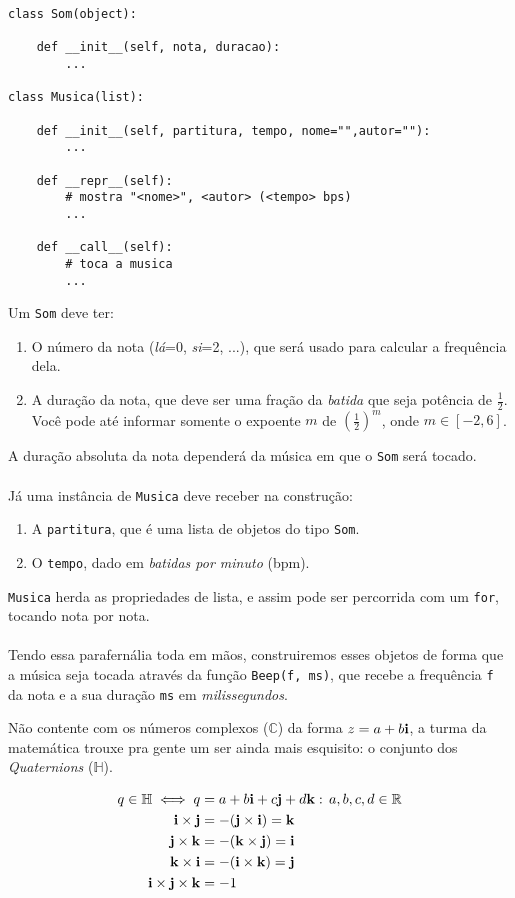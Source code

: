 \documentclass[12pt]{article}
\begin{document}
	\begin{lstlisting}
class Som(object):

    def __init__(self, nota, duracao):
        ...
        
class Musica(list):

    def __init__(self, partitura, tempo, nome="",autor=""):
        ...
        
    def __repr__(self):
        # mostra "<nome>", <autor> (<tempo> bps)
        ...
        
    def __call__(self):
        # toca a musica
        ...
	\end{lstlisting}
	Um \texttt{Som} deve ter:
	\begin{enumerate}
		\item O número da nota (\emph{lá}=0, \emph{si}=2, ...), que será usado para calcular a frequência dela.
		\item A duração da nota, que deve ser uma fração da \emph{batida} que seja potência de $\frac{1}{2}$. Você pode até informar somente o expoente $m$ de $(\frac{1}{2})^{m}$, onde $m \in [-2, 6]$.
	\end{enumerate}
	A duração absoluta da nota dependerá da música em que o \texttt{Som} será tocado.
	\\ \\
	Já uma instância de \texttt{Musica} deve receber na construção:
	\begin{enumerate}
		\item A \texttt{partitura}, que é uma lista de objetos do tipo \texttt{Som}.
		\item O \texttt{tempo}, dado em \emph{batidas por minuto} (bpm).
	\end{enumerate}
	\texttt{Musica} herda as propriedades de lista, e assim pode ser percorrida com um \texttt{for}, tocando nota por nota.
	\\ \\
	Tendo essa parafernália toda em mãos, construiremos esses objetos de forma que a música seja tocada através da função \texttt{Beep(f, ms)}, que recebe a frequência \texttt{f} da nota e a sua duração \texttt{ms} em \emph{milissegundos}.

	
	Não contente com os números complexos ($\mathbb{C}$) da forma $z = a + b\mathbf{i}$, a turma da matemática trouxe pra gente um ser ainda mais esquisito: o conjunto dos \emph{Quaternions} ($\mathbb{H}$).
	
	\begin{align*}
	q \in \mathbb{H} \iff q &= a + b \mathbf{i} + c \mathbf{j} + d \mathbf{k} : \, a,b,c,d \in \mathbb{R}\\
	\mathbf{i} \times \mathbf{j} &= -(\mathbf{j} \times \mathbf{i}) = \mathbf{k}\\
	\mathbf{j} \times \mathbf{k} &= -(\mathbf{k} \times \mathbf{j}) = \mathbf{i}\\
	\mathbf{k} \times \mathbf{i} &= -(\mathbf{i} \times \mathbf{k}) = \mathbf{j}\\
	\mathbf{i} \times \mathbf{j} \times \mathbf{k} &= -1	
	\end{align*}
	
\end{document}
